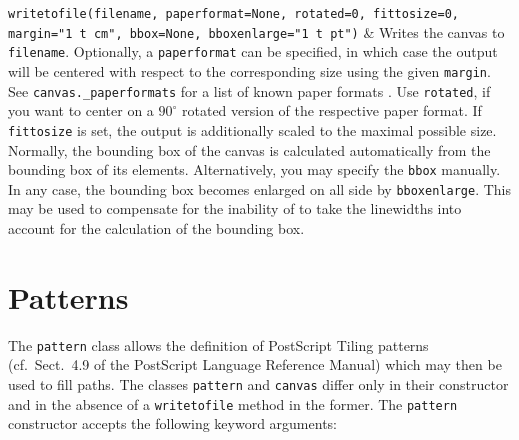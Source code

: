 \begin{tabularx}
    \texttt{writetofile(filename, 
      \newline\phantom{writetofile(}paperformat=None, 
      \newline\phantom{writetofile(}rotated=0,
      \newline\phantom{writetofile(}fittosize=0, 
      \newline\phantom{writetofile(}margin="1 t cm",
      \newline\phantom{writetofile(}bbox=None,
      \newline\phantom{writetofile(}bboxenlarge="1 t pt")} &
  Writes the canvas to \texttt{filename}. Optionally, a
  \texttt{paperformat} can be specified, in which case the output will
  be centered with respect to the corresponding size using the given
  \texttt{margin}. See \texttt{canvas.\_paperformats} for a list of
  known paper formats . Use \texttt{rotated}, if you want to center on
  a $90^\circ$ rotated version of the respective paper format. If
  \texttt{fittosize} is set, the output is additionally scaled to the
  maximal possible size. Normally, the bounding box of the canvas is 
  calculated automatically from the bounding box of its elements.
  Alternatively, you may specify the \texttt{bbox} manually. In any
  case, the bounding box becomes enlarged on all side by
  \texttt{bboxenlarge}. This may be used to compensate for the
  inability of \PyX to take the linewidths into account for the
  calculation of the bounding box.
\end{tabularx} 
\medskip

\section{Patterns}

The \texttt{pattern} class allows the definition of PostScript Tiling
patterns (cf.\ Sect.~4.9 of the PostScript Language Reference Manual)
which may then be used to fill paths. The classes \texttt{pattern} and
\texttt{canvas} differ only in their constructor and in the absence of
a \texttt{writetofile} method in the former. The \texttt{pattern}
constructor accepts the following keyword arguments:

